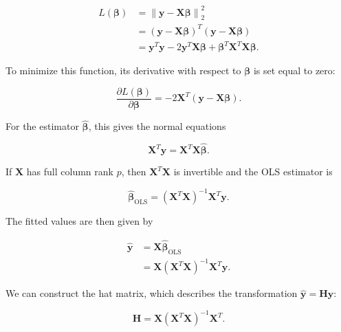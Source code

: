 \documentclass[english]{pwr_wmat_praca_dyplomowa}
\theoremstyle{definition}
\theoremstyle{remark}
\begin{document}
\begin{align}
    L(\boldsymbol{\beta}) &= \left\lVert\mathbf{y}-\mathbf{X}\boldsymbol{\beta}\right\rVert_2^2 \\
    &= \left(\mathbf{y}-\mathbf{X}\boldsymbol{\beta}\right)^T \left(\mathbf{y}-\mathbf{X}\boldsymbol{\beta}\right) \\
    &= \mathbf{y}^T\mathbf{y} - 2\mathbf{y}^T\mathbf{X}\boldsymbol{\beta} + \boldsymbol{\beta}^T \mathbf{X}^T\mathbf{X} \boldsymbol{\beta}.
\end{align}

To minimize this function, its derivative with respect to $\boldsymbol{\beta}$ is set equal to zero:

\begin{equation}
    \frac{\partial L(\boldsymbol{\beta})}{\partial \boldsymbol{\beta}} = -2\mathbf{X}^T \left( \mathbf{y}-\mathbf{X}\boldsymbol{\beta} \right).
\end{equation}

For the estimator $\widehat{\boldsymbol{\beta}}$, this gives the normal equations \cite[equation~2.2]{agresti}

\begin{equation}
    \mathbf{X}^T\mathbf{y} = \mathbf{X}^T\mathbf{X} \widehat{\boldsymbol{\beta}}.
\end{equation}

If $\mathbf{X}$ has full column rank $p$, then $\mathbf{X}^T\mathbf{X}$ is invertible and the OLS estimator 
\newline
is~\mbox{\cite[equation~2.3]{agresti}}

\begin{equation}
    \widehat{\boldsymbol{\beta}}_{\mathrm{OLS}} = \left(\mathbf{X}^T\mathbf{X}\right)^{-1} \mathbf{X}^T\mathbf{y}.
    \label{eq:ols-estimator}
\end{equation}

The fitted values are then given by

\begin{align}
    \widehat{\mathbf{y}} &= \mathbf{X}\widehat{\boldsymbol{\beta}}_{\mathrm{OLS}} \\
    &= \mathbf{X} \left(\mathbf{X}^T\mathbf{X}\right)^{-1}\mathbf{X}^T\mathbf{y}.
\end{align}

We can construct the hat matrix, which describes the transformation $\widehat{\mathbf{y}} = \mathbf{H}\mathbf{y}$:

\begin{equation}
    \mathbf{H} = \mathbf{X} \left(\mathbf{X}^T\mathbf{X}\right)^{-1}\mathbf{X}^T.
    \label{eq:hat-matrix}
\end{equation}
\end{document}
